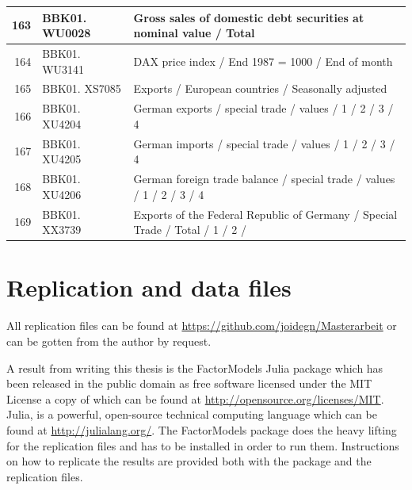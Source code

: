 \documentclass[12pt]{article}
\begin{document}
\begin{table}[ht]
\begin{tabular}{r|p{4cm}p{11cm}}
	\hline
	163 & BBK01. WU0028 & Gross sales of domestic debt securities at nominal value / Total \\ 
	\hline
	164 & BBK01. WU3141 & DAX price index / End 1987 = 1000 / End of month \\ 
	\hline
	165 & BBK01. XS7085 & Exports / European countries / Seasonally adjusted \\ 
	\hline
	166 & BBK01. XU4204 & German exports / special trade / values / 1 / 2 / 3 / 4 \\ 
	\hline
	167 & BBK01. XU4205 & German imports / special trade / values / 1 / 2 / 3 / 4 \\ 
	\hline
	168 & BBK01. XU4206 & German foreign trade balance / special trade / values / 1 / 2 / 3 / 4 \\ 
	\hline
	169 & BBK01. XX3739 & Exports of the Federal Republic of Germany / Special Trade / Total / 1 / 2 / \\ 
	\hline
    \hline
\end{tabular}
\end{table}


\clearpage
\newpage
\section{Replication and data files}
\label{replication and data files}
All replication files can be found at \url{https://github.com/joidegn/Masterarbeit} or can be gotten from the author by request.

A result from writing this thesis is the FactorModels Julia package which has been released in the public domain as free software licensed under the MIT License a copy of which can be found at \url{http://opensource.org/licenses/MIT}. Julia, is a powerful, open-source technical computing language which can be found at \url{http://julialang.org/}. The FactorModels package does the heavy lifting for the replication files and has to be installed in order to run them. Instructions on how to replicate the results are provided both with the package and the replication files.


\clearpage
\newpage



\clearpage
\newpage
{}
\restoregeometry
\thispagestyle{empty}
\singlespacing
\end{document}
